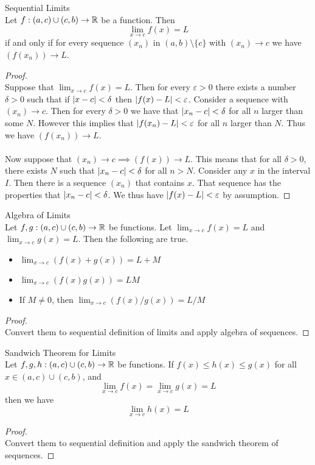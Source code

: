 \documentclass[a4paper]{article}
\begin{document}
\begin{thm}{Sequential Limits}{}\\ Let $f:(a,c)\cup(c,b)\to\mathbb{R}$ be a function. Then $$\lim_{x\to c}f(x)=L$$ if and only if for every sequence $(x_n)$ in $(a,b)\setminus\{c\}$ with $(x_n)\to c$ we have $(f(x_n))\to L$. 
\begin{proof}\\ Suppose that $\lim_{x\to c}f(x)=L$. Then for every $\varepsilon>0$ there exists a number $\delta>0$ such that if $\abs{x-c}<\delta$ then $\abs{f(x)-L}<\varepsilon$. Consider a sequence with $(x_n)\to c$. Then for every $\delta>0$ we have that $\abs{x_n-c}<\delta$ for all $n$ larger than some $N$. However this implies that $\abs{f(x_n)-L}<\varepsilon$ for all $n$ larger than $N$. Thus we have $(f(x_n))\to L$. \\~\\ 
Now suppose that $(x_n)\to c\implies (f(x))\to L$. This means that for all $\delta>0$, there exists $N$ such that $\abs{x_n-c}<\delta$ for all $n>N$. Consider any $x$ in the interval $I$. Then there is a sequence $(x_n)$ that contains $x$. That sequence has the properties that $\abs{x_n-c}<\delta$. We thus have $\abs{f(x)-L}<\varepsilon$ by assumption. 
\end{proof}
\end{thm}

\begin{prp}{Algebra of Limits}{}\\ Let $f,g:(a,c)\cup(c,b)\to\mathbb{R}$ be functions. Let $\lim_{x\to c}f(x)=L$ and $\lim_{x\to c}g(x)=L$. Then the following are true. 
\begin{itemize}
\item $\lim_{x\to c}\left(f(x)+g(x)\right)=L+M$
\item $\lim_{x\to c}\left(f(x)g(x)\right)=LM$
\item If $M\neq 0$, then $\lim_{x\to c}(f(x)/g(x))=L/M$
\end{itemize}
\begin{proof}\\ Convert them to sequential definition of limits and apply algebra of sequences. 
\end{proof}
\end{prp}

\begin{thm}{Sandwich Theorem for Limits}{}\\ Let $f,g,h:(a,c)\cup(c,b)\to\mathbb{R}$ be functions. If $f(x)\leq h(x)\leq g(x)$ for all $x\in (a,c)\cup(c,b)$, and $$\lim_{x\to c}f(x)=\lim_{x\to c}g(x)=L$$ then we have $$\lim_{x\to c}h(x)=L$$ 
\begin{proof}\\ Convert them to sequential definition and apply the sandwich theorem of sequences. 
\end{proof}
\end{thm}
\end{document}
